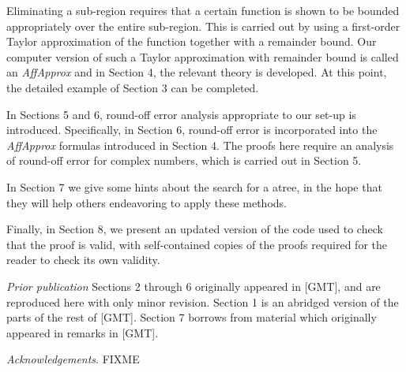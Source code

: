 Eliminating 
a sub-region requires that a certain function is shown to be bounded 
appropriately over the entire sub-region.  This is carried out by using a 
first-order Taylor approximation of the function together with a 
remainder 
bound.
Our computer version of such a Taylor approximation with remainder bound 
is called an {\it AffApprox} and in Section 4,
the relevant theory is developed.
At this point, the detailed example of Section 3 can be completed.

In Sections 5 and 6, round-off error analysis appropriate to our 
set-up is introduced.  Specifically, in Section 6, round-off error is 
incorporated 
into the {\it AffApprox} formulas introduced in Section 4.  The proofs here 
require an analysis of round-off error for complex numbers, which is carried 
out in Section 5.

In Section 7 we give some hints about the search for a atree,
in the hope that they will help others endeavoring to apply these methods.

Finally, in Section 8, we present an updated version of
the code used to check that the proof is valid,
with self-contained copies of the proofs required for the reader
to check its own validity.

{\it Prior publication}
Sections 2 through 6 originally appeared in [GMT],
and are reproduced here with only minor revision.
Section 1 is an abridged version of the parts of the rest of [GMT].
Section 7 borrows from material which originally appeared in remarks in [GMT].

{\it Acknowledgements}.
FIXME
